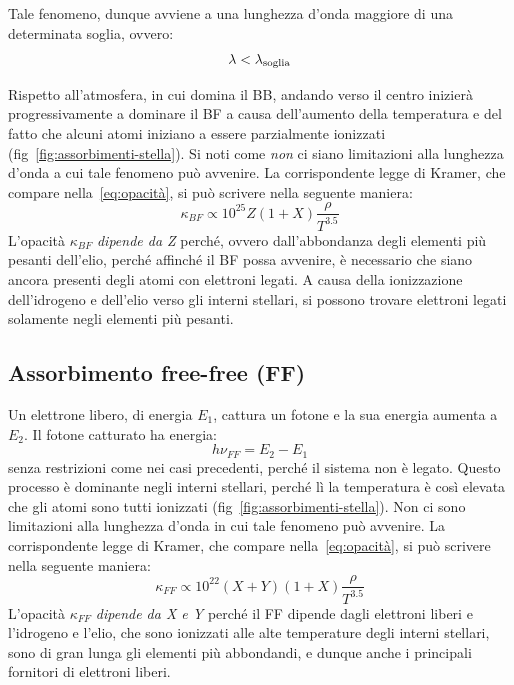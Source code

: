 Tale fenomeno, dunque avviene a una lunghezza d'onda maggiore di una determinata soglia, ovvero:
\begin{equation}\label{eq:lunghezza-BF}
    \lambda < \lambda_\textup{soglia}
\end{equation}

Rispetto all'atmosfera, in cui domina il BB, andando verso il centro inizierà progressivamente a dominare il BF a causa dell'aumento della temperatura e del fatto che  alcuni atomi iniziano a essere parzialmente ionizzati (fig~\ref{fig:assorbimenti-stella}). Si noti come \emph{non} ci siano limitazioni alla lunghezza d'onda a cui tale fenomeno può avvenire. La corrispondente legge di Kramer, che compare nella~\eqref{eq:opacità}, si può scrivere nella seguente maniera:
\begin{equation}
    \kappa_{BF} \propto 10^{25} Z (1+X) \dfrac{\rho}{T^{3.5}}
\end{equation}
L'opacità $\kappa_{BF}$ \emph{dipende da Z} perché, ovvero dall'abbondanza degli elementi più pesanti dell'elio, perché affinché il BF possa avvenire, è necessario che siano ancora presenti degli atomi con elettroni legati. A causa della ionizzazione dell'idrogeno e dell'elio verso gli interni stellari, si possono trovare elettroni legati solamente negli elementi più pesanti.

\subsection{Assorbimento free-free (FF)}\label{sec:free-free}
Un elettrone libero, di energia $E_1$, cattura un fotone e la sua energia aumenta a $E_2$. Il fotone catturato ha energia:
\begin{equation}
    h \nu_{FF} = E_2 - E_1
\end{equation}
senza restrizioni come nei casi precedenti, perché il sistema non è legato. Questo processo è dominante negli interni stellari, perché lì la temperatura è così elevata che gli atomi sono tutti ionizzati (fig~\ref{fig:assorbimenti-stella}). Non ci sono limitazioni alla lunghezza d'onda in cui tale fenomeno può avvenire. La corrispondente legge di Kramer, che compare nella~\eqref{eq:opacità}, si può scrivere nella seguente maniera:
\begin{equation}
   \kappa_{FF} \propto 10^{22} (X+Y) (1+X) \dfrac{\rho}{T^{3.5}}
\end{equation}
L'opacità $\kappa_{FF}$ \emph{dipende da X e Y} perché il FF dipende dagli elettroni liberi e l'idrogeno e l'elio, che sono ionizzati alle alte temperature degli interni stellari, sono di gran lunga gli elementi più abbondandi, e dunque anche i principali fornitori di elettroni liberi.

